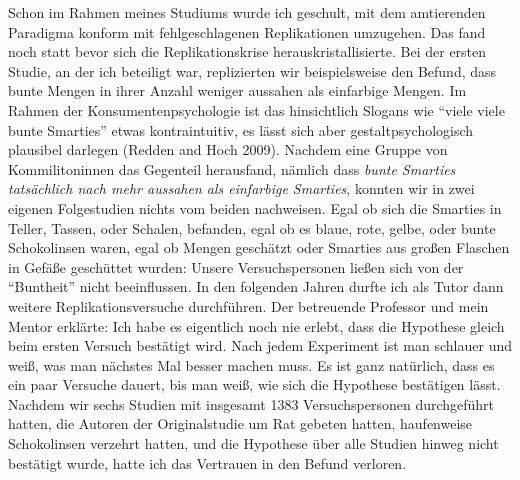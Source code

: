 \documentclass[
  letterpaper,
  DIV=11,
  numbers=noendperiod]{scrreprt}
\begin{document}
\begin{tcolorbox}[enhanced jigsaw, left=2mm, colback=white, colframe=quarto-callout-tip-color-frame, opacitybacktitle=0.6, opacityback=0, title=\textcolor{quarto-callout-tip-color}{\faLightbulb}\hspace{0.5em}{Beim ersten Versuch klappt es nie: Paradigmenwechsel in der Psychologie}, toptitle=1mm, coltitle=black, colbacktitle=quarto-callout-tip-color!10!white, titlerule=0mm, bottomtitle=1mm, leftrule=.75mm, breakable, rightrule=.15mm, bottomrule=.15mm, toprule=.15mm, arc=.35mm]

Schon im Rahmen meines Studiums wurde ich geschult, mit dem amtierenden
Paradigma konform mit fehlgeschlagenen Replikationen umzugehen. Das fand
noch statt bevor sich die Replikationskrise herauskristallisierte. Bei
der ersten Studie, an der ich beteiligt war, replizierten wir
beispielsweise den Befund, dass bunte Mengen in ihrer Anzahl weniger
aussahen als einfarbige Mengen. Im Rahmen der Konsumentenpsychologie ist
das hinsichtlich Slogans wie ``viele viele bunte Smarties'' etwas
kontraintuitiv, es lässt sich aber gestaltpsychologisch plausibel
darlegen (Redden and Hoch 2009). Nachdem eine Gruppe von Kommilitoninnen
das Gegenteil herausfand, nämlich dass \emph{bunte Smarties tatsächlich
nach mehr aussahen als einfarbige Smarties}, konnten wir in zwei eigenen
Folgestudien nichts vom beiden nachweisen. Egal ob sich die Smarties in
Teller, Tassen, oder Schalen, befanden, egal ob es blaue, rote, gelbe,
oder bunte Schokolinsen waren, egal ob Mengen geschätzt oder Smarties
aus großen Flaschen in Gefäße geschüttet wurden: Unsere Versuchspersonen
ließen sich von der ``Buntheit'' nicht beeinflussen. In den folgenden
Jahren durfte ich als Tutor dann weitere Replikationsversuche
durchführen. Der betreuende Professor und mein Mentor erklärte: Ich habe
es eigentlich noch nie erlebt, dass die Hypothese gleich beim ersten
Versuch bestätigt wird. Nach jedem Experiment ist man schlauer und weiß,
was man nächstes Mal besser machen muss. Es ist ganz natürlich, dass es
ein paar Versuche dauert, bis man weiß, wie sich die Hypothese
bestätigen lässt. Nachdem wir sechs Studien mit insgesamt 1383
Versuchspersonen durchgeführt hatten, die Autoren der Originalstudie um
Rat gebeten hatten, haufenweise Schokolinsen verzehrt hatten, und die
Hypothese über alle Studien hinweg nicht bestätigt wurde, hatte ich das
Vertrauen in den Befund verloren.


\end{tcolorbox}
\end{document}
